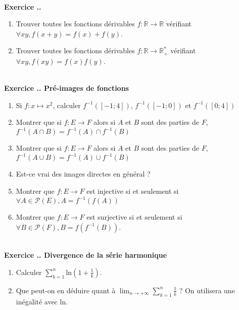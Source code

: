 \documentclass{article}
\newcommand{\mb}[1]{\mathbb{#1}}
\newcounter{exo}
\newcommand{\exercice}[1][\null]{\textbf{\\ \large Exercice \thesection.\theexo. \normalsize #1} \addtocounter{exo}{1}}
\begin{document}
\exercice

\begin{enumerate}

\item Trouver toutes les fonctions dérivables $f :\mb{R} \rightarrow \mb{R}$ vérifiant $\forall xy, f(x+y) = f(x)+ f(y)$.

\item Trouver toutes les fonctions dérivables $f :\mb{R} \rightarrow \mb{R}^*_+$ vérifiant $\forall xy, f(xy) = f(x)f(y)$.
\end{enumerate}


\exercice[Pré-images de fonctions]

\begin{enumerate}
    \item Si $f : x \mapsto x^2$, calculer 
        $f^{-1}( [-1;4])$, $f^{-1}([-1;0])$
        et $f^{-1}([0;4])$

    \item Montrer que si $f : E \to F$ alors 
        si $A$ et $B$ sont des parties de $F$,
        $f^{-1}(A \cap B) = f^{-1} (A) \cap f^{-1}( B)$

    \item Montrer que si $f : E \to F$ alors 
        si $A$ et $B$ sont des parties de $F$,
        $f^{-1}(A \cup B) = f^{-1} (A) \cup f^{-1}( B)$

    \item Est-ce vrai des images directes en général ?

    \item Montrer que $f : E \to F$ est injective 
        si et seulement si $\forall A \in \mathcal{P}(E),
        A = f^{-1}(f(A))$

    \item Montrer que $f : E \to F$ est surjective 
        si et seulement si $\forall B \in \mathcal{P}(F),
        B = f( f^{-1} (B))$.
\end{enumerate}

\exercice[Divergence de la série harmonique]

\begin{enumerate}

\item Calculer $\displaystyle \sum_{k=1}^n  \text{ln}(1+ \frac{1}{k})$.

\item Que peut-on en déduire quant à $\displaystyle \lim_{n \to + \infty} \sum_{k=1}^n \frac{1}{k}$ ? On utilisera une inégalité avec $\text{ln}$.
\end{enumerate}
\end{document}
